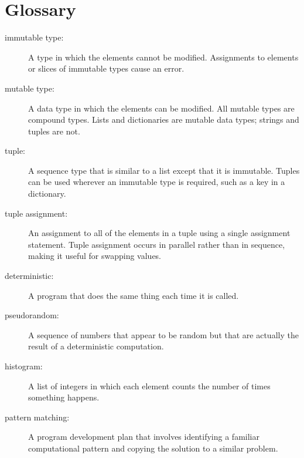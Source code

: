 \pagebreak

\section{Glossary}

\begin{description}

\item[immutable type:] A type in which the elements cannot be
modified.  Assignments
to elements or slices of immutable types cause an error.

\item[mutable type:] A data type in which the elements can be
modified.  All mutable
types are compound types.  Lists and dictionaries are mutable data
types; strings and tuples are not.

\item[tuple:] A sequence type that is similar to a list except that it is
immutable.  Tuples can be used wherever an immutable type is required, such
as a key in a dictionary.

\item[tuple assignment:] An assignment to all of the elements in a tuple using
a single assignment statement. Tuple assignment occurs in parallel rather
than in sequence, making it useful for swapping values.

\item[deterministic:] A program that does the same thing each time it is
called.

\item[pseudorandom:] A sequence of numbers that appear to be random but that
are actually the result of a deterministic computation.

\item[histogram:] A list of integers in which each element counts the 
number of times something happens.

\item[pattern matching:] A program development plan that involves
identifying a familiar computational pattern and copying the
solution to a similar problem.


\end{description}


